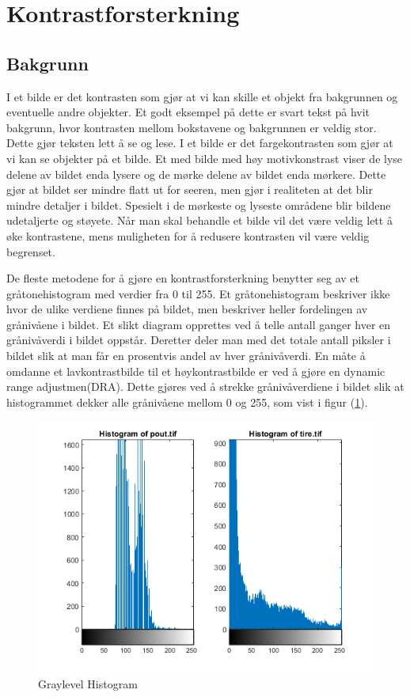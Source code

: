 \section{Kontrastforsterkning}
\label{sec:Kontrastforsterkning}
\subsection{Bakgrunn}
I et bilde er det kontrasten som gjør at vi kan skille et objekt fra bakgrunnen og eventuelle andre objekter.\cite{wiki:kontrast} Et godt eksempel på dette er svart tekst på hvit bakgrunn, hvor kontrasten mellom bokstavene og bakgrunnen er veldig stor. Dette gjør teksten lett å se og lese. I et bilde er det fargekontrasten som gjør at vi kan se objekter på et bilde. Et med bilde med høy motivkonstrast\cite{wiki:kontrastD} viser de lyse delene av bildet enda lysere og de mørke delene av bildet enda mørkere. Dette gjør at bildet ser mindre flatt ut for seeren, men gjør i realiteten at det blir mindre detaljer i bildet. Spesielt i de mørkeste og lyseste områdene blir bildene udetaljerte og støyete. Når man skal behandle et bilde vil det være veldig lett å øke kontrastene, mens muligheten for å redusere kontrasten vil være veldig begrenset. 

De fleste metodene for å gjøre en kontrastforsterkning benytter seg av et gråtonehistogram med verdier fra 0 til 255. Et gråtonehistogram beskriver ikke hvor de ulike verdiene finnes på bildet, men beskriver heller fordelingen av grånivåene i bildet. Et slikt diagram opprettes ved å telle antall ganger hver en grånivåverdi i bildet oppstår. Deretter deler man med det totale antall piksler i bildet slik at man får en prosentvis andel av hver grånivåverdi. En måte å omdanne et lavkontrastbilde til et høykontrastbilde er ved å gjøre en dynamic range adjustmen(DRA)\cite{Contrast:Human}. Dette gjøres ved å strekke grånivåverdiene i bildet slik at histogrammet dekker alle grånivåene mellom 0 og 255, som vist i figur (\ref{Figur 2}).

\begin{figure}
\begin{center}
    \includegraphics[width=0.3\columnwidth]{bilder/graylevelhistogram.png}
    \caption{Graylevel Histogram \label{Figur 2}} 
\end{center}
\end{figure}

